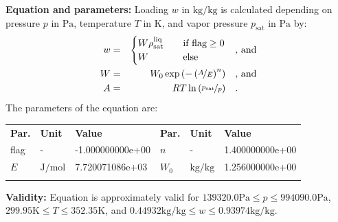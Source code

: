 \textbf{Equation and parameters:}
\newline
%
Loading $w$ in $\si{\kilogram\per\kilogram}$ is calculated depending on pressure $p$ in $\si{\pascal}$, temperature $T$ in $\si{\kelvin}$, and vapor pressure $p_\mathrm{sat}$ in $\si{\pascal}$ by:
%
\begin{equation*}
\begin{split}
w &=& \begin{cases} W \rho_\mathrm{sat}^{\mathrm{liq}} & \quad \text{if flag} \geq 0 \\ W & \quad \text{else} \end{cases} & \quad\text{, and} \\
W &=& W_0 \exp \left( - \left( \nicefrac{A}{E} \right) ^{n} \right) & \quad\text{, and} \\
A &=& R T \ln \left( \nicefrac{p_\mathrm{sat}}{p} \right) & \quad\text{.} \\
\end{split}
\end{equation*}
%
The parameters of the equation are:
%
\begin{longtable}[l]{lll|lll}
\toprule
\addlinespace
\textbf{Par.} & \textbf{Unit} & \textbf{Value} &	\textbf{Par.} & \textbf{Unit} & \textbf{Value} \\
\addlinespace
\midrule
\endhead

\bottomrule
\endfoot
\bottomrule
\endlastfoot
\addlinespace

flag & - & -1.000000000e+00 & $n$ & - & 1.400000000e+00 \\
$E$ & $\si{\joule\per\mole}$ & 7.720071086e+03 & $W_0$ & $\si{\kilogram\per\kilogram}$ & 1.256000000e+00 \\

\addlinespace\end{longtable}

\textbf{Validity:}
\newline
Equation is approximately valid for $139320.0 \si{\pascal} \leq p \leq 994090.0 \si{\pascal}$,  $299.95 \si{\kelvin} \leq T \leq 352.35 \si{\kelvin}$, and $0.44932 \si{\kilogram\per\kilogram} \leq w \leq 0.93974 \si{\kilogram\per\kilogram}$.
\newline

